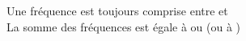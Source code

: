 \begin{remarquebox}
    Une fréquence est toujours comprise entre  et  \\

    La somme des fréquences est égale à  ou (ou à )

\end{remarquebox}

